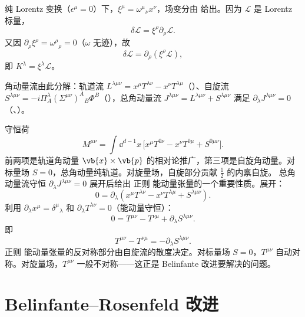 纯 Lorentz 变换（$\epsilon^\mu=0$）下，$\xi^\mu=\omega^\mu{}_\nu x^\nu$，场变分由 给出。因为 $\mathcal{L}$ 是 Lorentz 标量，
\begin{equation*}
\delta\mathcal{L}=\xi^\rho\partial_\rho\mathcal{L}.
\end{equation*}
又因 $\partial_\rho\xi^\rho=\omega^\rho{}_\rho=0$（$\omega$ 无迹），故
\begin{equation*}
\delta\mathcal{L}=\partial_\rho(\xi^\rho\mathcal{L}),
\end{equation*}
即 $K^\lambda=\xi^\lambda\mathcal{L}$。

角动量流由此分解：轨道流 $L^{\lambda\mu\nu}=x^\mu T^{\lambda\nu}-x^\nu T^{\lambda\mu}$（）、自旋流 $S^{\lambda\mu\nu}=-i\Pi_A^\lambda(\Sigma^{\mu\nu})^A{}_B\Phi^B$（），总角动量流 $J^{\lambda\mu\nu}=L^{\lambda\mu\nu}+S^{\lambda\mu\nu}$ 满足 $\partial_\lambda J^{\lambda\mu\nu}=0$（、）。

守恒荷
\begin{equation*}{
M^{\mu\nu}=\int \dd^{d-1}x\,\big[x^\mu T^{0\nu}-x^\nu T^{0\mu}+S^{0\mu\nu}\big].
}
\end{equation*}
前两项是轨道角动量 $\vb{x}\times\vb{p}$ 的相对论推广，第三项是自旋角动量。对标量场 $S=0$，总角动量纯轨道。对旋量场，自旋部分贡献 $\frac{1}{2}$ 的内禀自旋。
总角动量流守恒 $\partial_\lambda J^{\lambda\mu\nu}=0$ 展开后给出 正则 能动量张量的一个重要性质。展开：
\begin{equation*}
0=\partial_\lambda(x^\mu T^{\lambda\nu}-x^\nu T^{\lambda\mu}+S^{\lambda\mu\nu}).
\end{equation*}
利用 $\partial_\lambda x^\mu=\delta^\mu{}_\lambda$ 和 $\partial_\lambda T^{\lambda\nu}=0$（能动量守恒）：
\begin{equation*}
0=T^{\mu\nu}-T^{\nu\mu}+\partial_\lambda S^{\lambda\mu\nu}.
\end{equation*}
即
\begin{equation}\label{eq:ms-poincare-T-asym}
{
T^{\mu\nu}-T^{\nu\mu}=-\partial_\lambda S^{\lambda\mu\nu}.
}
\end{equation}
正则 能动量张量的反对称部分由自旋流的散度决定。对标量场 $S=0$，$T^{\mu\nu}$ 自动对称。对旋量场，$T^{\mu\nu}$ 一般不对称——这正是 Belinfante 改进要解决的问题。

\section{Belinfante--Rosenfeld 改进}

